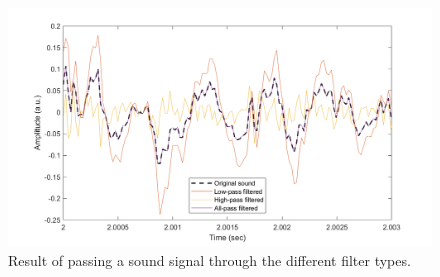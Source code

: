 \documentclass[journal]{IEEEtran}
\begin{document}

\begin{figure}[h]
    \centering
    \includegraphics[width=\columnwidth]{assignment_01/plots/filtered_sound.png}
    \caption{Result of passing a sound signal through the different filter types.}
    \label{fig:filtered_sound}
\end{figure}
\newpage
\end{document}
